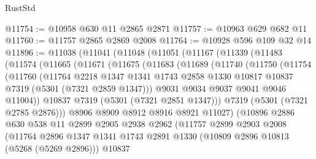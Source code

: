 \begin{lexlean}{RustStd}
\begin{coremodule}
@11754 := @10958 @630 @11 @2865 @2871
@11757 := @10963 @629 @682 @11
@11760 := @11757 @2865 @2869 @2008
@11764 := @10928 @596 @109 @32 @14
@11896 := @11038
    (@11041
      (@11048
        (@11051
          (@11167
            (@11339
              (@11483
                (@11574
                  (@11665
                    (@11671
                      (@11675
                        (@11683
                          (@11689
                            (@11740
                              (@11750
                                (@11754
                                  (@11760
                                    (@11764
                                      @2218
                                      @1347
                                      @1341
                                      @1743
                                      @2858
                                      @1330
                                      @10817
                                      @10837
                                      @7319
                                      (@5301 (@7321 @2859 @1347)))
                                    @9031
                                    @9034
                                    @9037
                                    @9041
                                    @9046
                                    @11004))
                                @10837
                                @7319
                                (@5301 (@7321 @2851 @1347)))
                              @7319
                              (@5301 (@7321 @2785 @2876)))
                            @8906
                            @8909
                            @8912
                            @8916
                            @8921
                            @11027)
                          (@10896
                            @2886
                            @630
                            @538
                            @11
                            @2899
                            @2905
                            @2938
                            @2962
                            (@11757
                              @2899
                              @2903
                              @2008
                              (@11764
                                @2896
                                @1347
                                @1341
                                @1743
                                @2891
                                @1330
                                (@10809 @2896 @10813 (@5268 (@5269 @2896)))
                                @10837

\end{coremodule}
\end{lexlean}
